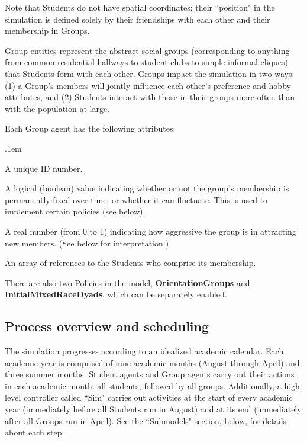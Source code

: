 Note that Students do not have spatial coordinates; their ``position" in the
simulation is defined solely by their friendships with each other and their
membership in Groups.

\vspace{.2in}

Group entities represent the abstract social groups (corresponding to anything
from common residential hallways to student clubs to simple informal cliques)
that Students form with each other. Groups impact the simulation in two ways:
(1) a Group's members will jointly influence each other's preference and hobby
attributes, and (2) Students interact with those in their groups more often
than with the population at large.

Each Group agent has the following attributes:

\begin{description}
\itemsep.1em

\item[ID] A unique ID number.

\item[IsFixed] A logical (boolean) value indicating whether or not the
group's membership is permanently fixed over time, or whether it can
fluctuate. This is used to implement certain policies (see below).

\item[RecruitmentFactor] A real number (from 0 to 1) indicating how
aggressive the group is in attracting new members. (See below for
interpretation.)

\item[Members] An array of references to the Students who comprise its
membership.

\end{description}

There are also two Policies in the model, \textbf{OrientationGroups} and
\textbf{InitialMixedRaceDyads}, which can be separately enabled.




\subsection{Process overview and scheduling}

The simulation progresses according to an idealized academic calendar. Each
academic year is comprised of nine academic months (August through April) and
three summer months. Student agents and Group agents carry out their actions
in each academic month: all students, followed by all groups. Additionally, a
high-level controller called ``Sim" carries out activities at the start of
every academic year (immediately before all Students run in August) and at its
end (immediately after all Groups run in April). See the ``Submodels" section,
below, for details about each step.


